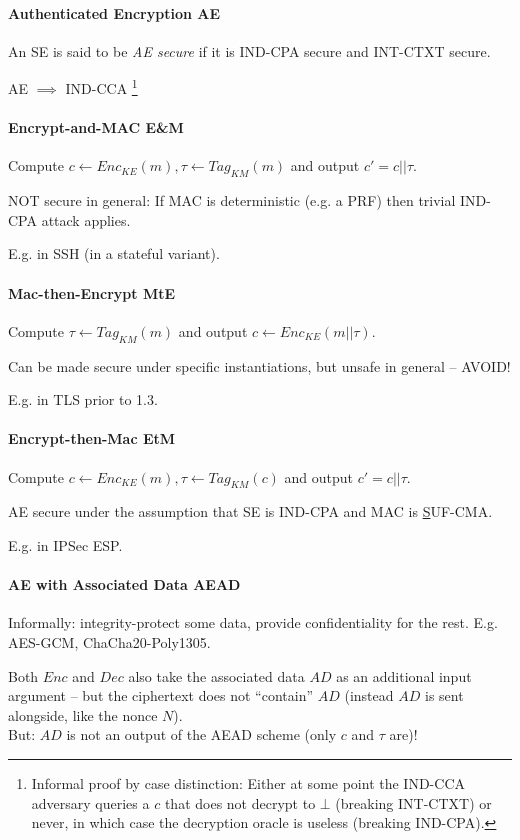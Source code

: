\paragraph{Authenticated Encryption AE}
An SE is said to be \emph{AE secure} if it is IND-CPA secure and INT-CTXT secure.

AE $\implies$ IND-CCA%
\footnote{Informal proof by case distinction:
Either at some point the IND-CCA adversary queries a $c$ that does not decrypt to $\bot$ (breaking INT-CTXT) or never, in which case the decryption oracle is useless (breaking IND-CPA).
}

\paragraph{Encrypt-and-MAC E\&M}
Compute $c \leftarrow Enc_{KE}(m), \tau \leftarrow Tag_{KM}(m)$ and output $c'=c||\tau$.

NOT secure in general:
If MAC is deterministic (e.g. a PRF) then trivial IND-CPA attack applies.

E.g. in SSH (in a stateful variant).

\paragraph{Mac-then-Encrypt MtE}
Compute $\tau \leftarrow Tag_{KM}(m)$ and output $c \leftarrow Enc_{KE}(m||\tau)$.

Can be made secure under specific instantiations, but unsafe in general -- AVOID!

E.g. in TLS prior to 1.3.

\paragraph{Encrypt-then-Mac EtM}
Compute $c \leftarrow Enc_{KE}(m), \tau \leftarrow Tag_{KM}(c)$ and output $c'=c||\tau$.

AE secure under the assumption that SE is IND-CPA and MAC is \underline{S}UF-CMA.

E.g. in IPSec ESP.

\paragraph{AE with Associated Data AEAD}
Informally: integrity-protect some data, provide confidentiality for the rest.
E.g. AES-GCM, ChaCha20-Poly1305.

Both $Enc$ and $Dec$ also take the associated data $AD$ as an additional input argument
-- but the ciphertext does not ``contain'' $AD$ (instead $AD$ is sent alongside, like the nonce $N$).
\\
But: $AD$ is not an output of the AEAD scheme (only $c$ and $\tau$ are)!

